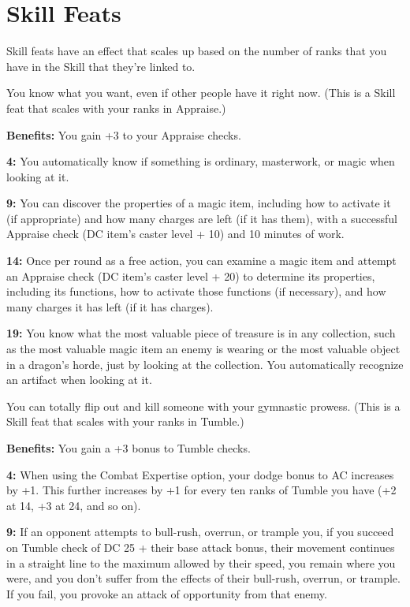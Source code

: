 \section{Skill Feats}

Skill feats have an effect that scales up based on the number of ranks that you have in the Skill that they're linked to.


You know what you want, even if other people have it right now. (This is a Skill feat that scales with your ranks in Appraise.)

\textbf{Benefits:} You gain +3 to your Appraise checks.

\textbf{4:} You automatically know if something is ordinary, masterwork, or magic when looking at it.

\textbf{9:} You can discover the properties of a magic item, including how to activate it (if appropriate) and how many charges are left (if it has them), with a successful Appraise check (DC item's caster level + 10) and 10 minutes of work.

\textbf{14:} Once per round as a free action, you can examine a magic item and attempt an Appraise check (DC item's caster level + 20) to determine its properties, including its functions, how to activate those functions (if necessary), and how many charges it has left (if it has charges).

\textbf{19:} You know what the most valuable piece of treasure is in any collection, such as the most valuable magic item an enemy is wearing or the most valuable object in a dragon's horde, just by looking at the collection. You automatically recognize an artifact when looking at it.

You can totally flip out and kill someone with your gymnastic prowess. (This is a Skill feat that scales with your ranks in Tumble.)

\textbf{Benefits:} You gain a +3 bonus to Tumble checks.

\textbf{4:} When using the Combat Expertise option, your dodge bonus to AC increases by +1. This further increases by +1 for every ten ranks of Tumble you have (+2 at 14, +3 at 24, and so on).

\textbf{9:} If an opponent attempts to bull-rush, overrun, or trample you, if you succeed on Tumble check of DC 25 + their base attack bonus, their movement continues in a straight line to the maximum allowed by their speed, you remain where you were, and you don't suffer from the effects of their bull-rush, overrun, or trample. If you fail, you provoke an attack of opportunity from that enemy.

